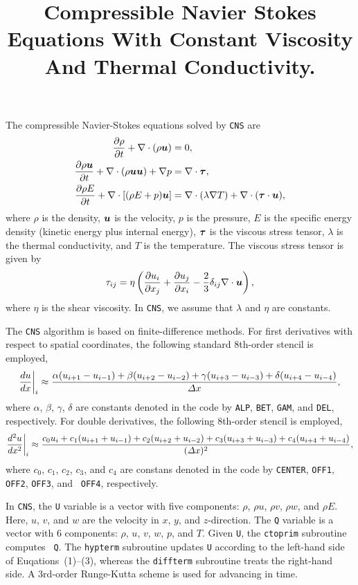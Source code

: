 \documentclass[11pt,letterpaper]{article}
\renewcommand{\vec}[1]{\mbox{\boldmath$#1$}}
\newcommand{\tensor}[1]{\mbox{\boldmath{\ensuremath{#1}}}}
\begin{document}
\title{Compressible Navier Stokes Equations With Constant Viscosity
  And Thermal Conductivity. } 
\maketitle

The compressible Navier-Stokes equations solved by {\tt CNS} are
\begin{align}
\frac{\partial \rho}{\partial t} + \nabla \cdot (\rho
    \vec{u})= { } & 0, \\
\frac{\partial \rho \vec{u}}{\partial t} + \nabla \cdot (\rho
    \vec{u}\vec{u}) + \nabla p= { } & \nabla \cdot
  \tensor{\tau}, \\
\frac{\partial \rho E}{\partial t} + \nabla \cdot [(\rho E + p)
  \vec{u}] = { } & \nabla \cdot (\lambda \nabla T) + \nabla \cdot
  (\tensor{\tau} \cdot \vec{u}),
\end{align}
where $\rho$ is the density, $\vec{u}$ is the velocity, $p$ is the
pressure, $E$ is the specific energy density (kinetic energy plus
internal energy), $\tensor{\tau}$ is the viscous stress tensor,
$\lambda$ is the thermal conductivity, and $T$ is the temperature.
The viscous stress tensor is given by
\begin{equation}
  \tau_{ij} = \eta \left(\frac{\partial u_i}{\partial x_j} +
    \frac{\partial u_j}{\partial x_i} - \frac{2}{3}
    \delta_{ij} \nabla \cdot \vec{u} \right), 
\end{equation}
where $\eta$ is the shear viscosity.  In {\tt CNS}, we assume that
$\lambda$ and $\eta$ are constants.

The {\tt CNS} algorithm is based on finite-difference methods.  For
first derivatives with respect to spatial coordinates, the following
standard 8th-order stencil is employed,
\begin{equation}
  \frac{du}{dx} \bigg{|}_{i} \approx \frac{\alpha (u_{i+1}-u_{i-1}) + \beta
  (u_{i+2}-u_{i-2}) + \gamma (u_{i+3}-u_{i-3}) +  \delta
  (u_{i+4}-u_{i-4})}{\Delta x},
\end{equation}
where $\alpha$, $\beta$, $\gamma$, $\delta$ are constants denoted in
the code by {\tt ALP}, {\tt BET}, {\tt GAM}, and {\tt DEL},
respectively.  For double derivatives, the following 8th-order stencil
is employed,
\begin{equation}
  \frac{d^2u}{dx^2} \bigg{|}_{i} \approx \frac{c_0 u_i + c_1 (u_{i+1}+u_{i-1}) + c_2
  (u_{i+2}+u_{i-2}) + c_3 (u_{i+3}+u_{i-3}) + c_4
  (u_{i+4}+u_{i-4})}{(\Delta x)^2},
\end{equation}
where $c_0$, $c_1$, $c_2$, $c_3$, and $c_4$ are constans denoted in
the code by {\tt CENTER}, {\tt OFF1}, {\tt OFF2}, {\tt OFF3}, and {\tt
  OFF4}, respectively.

In {\tt CNS}, the {\tt U} variable is a vector with five components:
$\rho$, $\rho u$, $\rho v$, $\rho w$, and $\rho E$. Here, $u$, $v$,
and $w$ are the velocity in $x$, $y$, and $z$-direction.  The {\tt Q}
variable is a vector with 6 components: $\rho$, $u$, $v$, $w$, $p$,
and $T$.  Given {\tt U}, the {\tt ctoprim} subroutine computes {\tt
  Q}.  The {\tt hypterm} subroutine updates {\tt U} according to the
left-hand side of Euqations~(1)--(3), whereas the {\tt diffterm}
subroutine treats the right-hand side.  A 3rd-order Runge-Kutta scheme
is used for advancing in time.
\end{document}
